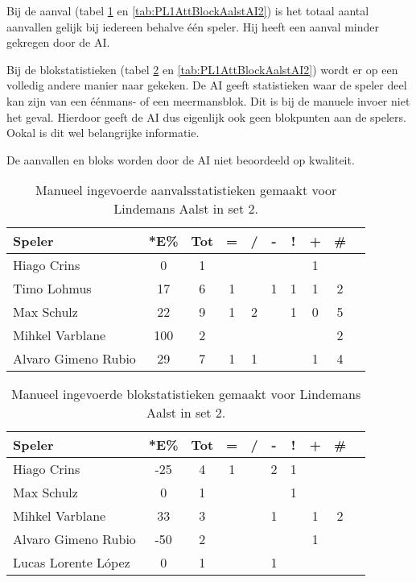 Bij de aanval (tabel \ref{tab:PL1AttAalstMan2} en \ref{tab:PL1AttBlockAalstAI2}) is het totaal aantal aanvallen gelijk bij iedereen behalve één speler. Hij heeft een aanval minder gekregen door de AI. 

Bij de blokstatistieken (tabel \ref{tab:PL1BlockAalstMan2} en \ref{tab:PL1AttBlockAalstAI2}) wordt er op een volledig andere manier naar gekeken. De AI geeft statistieken waar de speler deel kan zijn van een éénmans- of een meermansblok. Dit is bij de manuele invoer niet het geval. Hierdoor geeft de AI dus eigenlijk ook geen blokpunten aan de spelers. Ookal is dit wel belangrijke informatie.

De aanvallen en bloks worden door de AI niet beoordeeld op kwaliteit.

\begin{table}[ht!]
  \centering
  \scriptsize
    \begin{tabular}{|l|c|c|c|c|c|c|c|c|c|}
      \hline
      \textbf{Speler} & *E\% & Tot & = & / & - & ! & + & \# \\ \hline
      Hiago Crins  & 0 & 1 &  &  &  &  & 1 &  \\ 
      Timo Lohmus  & 17 & 6 & 1 &  & 1 & 1 & 1 & 2 \\ 
      Max Schulz  & 22 & 9 & 1 & 2 &  & 1 & 0 & 5\\
      Mihkel Varblane  & 100 & 2 &  &  &  &  &  & 2 \\ 
      Alvaro Gimeno Rubio & 29 & 7 & 1 & 1 &  &  & 1 & 4 \\ \hline 
  \end{tabular}
\caption[Manueel ingevoerde aanvalsstatistieken gemaakt Lindemans Aalst in set 2]{\label{tab:PL1AttAalstMan2}Manueel ingevoerde aanvalsstatistieken gemaakt voor Lindemans Aalst in set 2.}
\end{table}

\begin{table}[ht!]
  \centering
  \scriptsize
    \begin{tabular}{|l|c|c|c|c|c|c|c|c|c|}
      \hline
      \textbf{Speler} & *E\% & Tot & = & / & - & ! & + & \# \\ \hline
      Hiago Crins & -25 & 4 & 1 &  & 2 & 1 &  &  \\ 
      Max Schulz & 0 & 1 &  &  &  & 1 &  & \\
      Mihkel Varblane & 33 & 3 &  &  & 1 &  & 1 & 2 \\
      Alvaro Gimeno Rubio & -50 & 2 &  & &  &  & 1 &  \\
      Lucas Lorente López & 0 & 1 &  &  & 1 &  &  &  \\ \hline
  \end{tabular}
\caption[Manueel ingevoerde blokstatistieken gemaakt Lindemans Aalst in set 2]{\label{tab:PL1BlockAalstMan2}Manueel ingevoerde blokstatistieken gemaakt voor Lindemans Aalst in set 2.}
\end{table}

